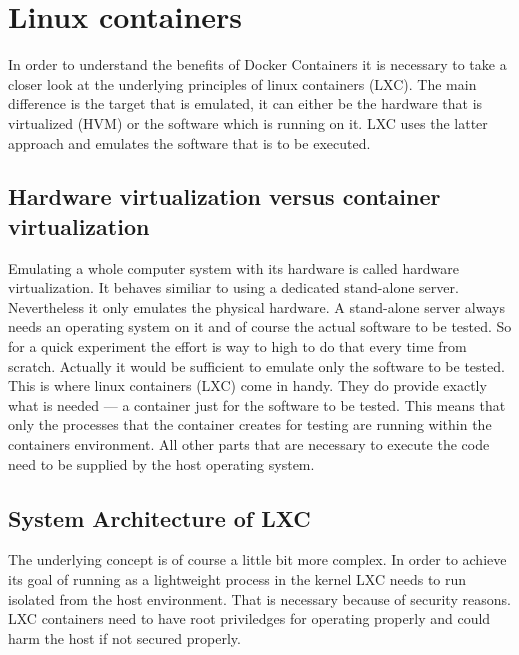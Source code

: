 \documentclass[conference]{IEEEtran}
\begin{document}
\section{Linux containers}
In order to understand the benefits of Docker Containers it is necessary to take a closer look at the underlying principles of linux containers (LXC). The main difference is the target that is emulated, it can either be the hardware that is virtualized (HVM) or the software which is running on it. LXC uses the latter approach and emulates the software that is to be executed.\\

\subsection{Hardware virtualization versus container virtualization}
Emulating a whole computer system with its hardware is called hardware virtualization. It behaves similiar to using a dedicated stand-alone server. Nevertheless it only emulates the physical hardware. A stand-alone server always needs an operating system on it and of course the actual software to be tested. So for a quick experiment the effort is way to high to do that every time from scratch. Actually it would be sufficient to emulate only the software to be tested.\\ 

This is where linux containers (LXC) come in handy. They do provide exactly what is needed --- a container just for the software to be tested. This means that only the processes that the container creates for testing are running within the containers environment. All other parts that are necessary to execute the code need to be supplied by the host operating system.\\

\subsection{System Architecture of LXC}
The underlying concept is of course a little bit more complex. In order to achieve its goal of running as a lightweight process in the kernel LXC needs to run isolated from the host environment. That is necessary because of security reasons. LXC containers need to have root priviledges for operating properly and could harm the host if not secured properly.\\
\end{document}
